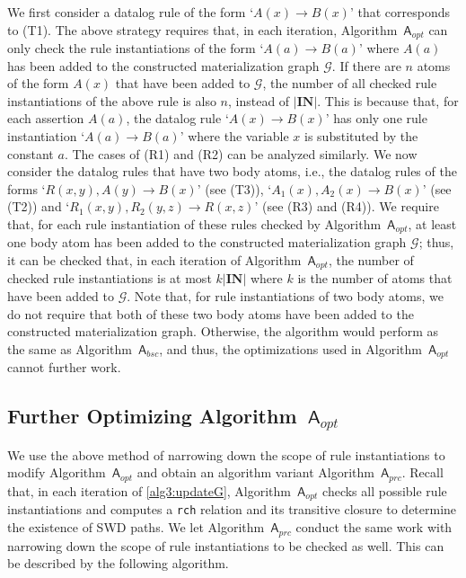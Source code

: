 \documentclass[final,1p,times]{elsarticle}
\begin{document}
We first consider a datalog rule of the
form `$A(x)\rightarrow B(x)$' that corresponds to (T1). The above strategy requires that,
in each iteration, Algorithm~$\mathsf{A}_{opt}$ can only check the rule instantiations
of the form `$A(a)\rightarrow B(a)$' where $A(a)$ has been added to the constructed materialization
graph $\mathcal{G}$. If there are $n$ atoms of the form $A(x)$ that have been added to $\mathcal{G}$,
the number of all checked rule instantiations of the above rule is also $n$, instead of $|\textbf{IN}|$.
This is because that, for each assertion $A(a)$,
the datalog rule `$A(x)\rightarrow B(x)$'
has only one rule instantiation `$A(a)\rightarrow B(a)$' where
the variable $x$ is substituted by the constant $a$.
The cases of (R1) and (R2) can be analyzed similarly.
We now consider the datalog rules that have two body atoms, i.e.,
the datalog rules of the forms `$R(x,y),A(y)\rightarrow B(x)$' (see (T3)),
`$A_1(x),A_2(x)\rightarrow B(x)$' (see (T2)) and `$R_1(x,y),R_2(y,z)\rightarrow R(x,z)$' (see (R3) and (R4)).
We require that, for each rule instantiation of these rules checked by Algorithm~$\mathsf{A}_{opt}$,
at least one body atom has been added to the constructed materialization
graph $\mathcal{G}$; thus, it can be checked that, in each iteration of Algorithm~$\mathsf{A}_{opt}$,
the number of checked rule instantiations
is at most $k|\textbf{IN}|$ where $k$ is the number of atoms that have been
added to $\mathcal{G}$.
Note that, for rule instantiations of two body atoms,
we do not require that both of these two body atoms have been added to
the constructed materialization graph.
Otherwise, the algorithm would
perform as the same as Algorithm~$\mathsf{A}_{bsc}$, and thus, the
optimizations used in Algorithm~$\mathsf{A}_{opt}$ cannot further work.



\subsection{Further Optimizing Algorithm~$\mathsf{A}_{opt}$}


We use the above method of narrowing down the scope of rule instantiations to
modify Algorithm~$\mathsf{A}_{opt}$ and obtain an algorithm variant Algorithm~$\mathsf{A}_{prc}$.
Recall that,
in each iteration of \ref{alg3:updateG}, Algorithm~$\mathsf{A}_{opt}$
checks all possible rule instantiations and computes a \texttt{rch} relation
and its transitive closure to determine the existence of SWD paths.
We let Algorithm~$\mathsf{A}_{prc}$ conduct the same work with
narrowing down the scope of rule instantiations to be checked as well. This can be described
by the following algorithm.\\
\end{document}
